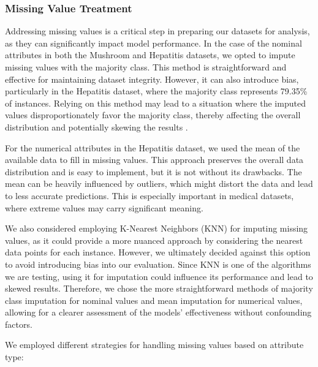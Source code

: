 \subsubsection{Missing Value Treatment}
Addressing missing values is a critical step in preparing our datasets for analysis, as they can significantly impact model performance.
In the case of the nominal attributes in both the Mushroom and Hepatitis datasets, we opted to impute missing values with the majority class.
This method is straightforward and effective for maintaining dataset integrity.
However, it can also introduce bias, particularly in the Hepatitis dataset, where the majority class represents 79.35\% of instances.
Relying on this method may lead to a situation where the imputed values disproportionately favor the majority class, thereby affecting the overall distribution
and potentially skewing the results \cite{data_cleaning}.

For the numerical attributes in the Hepatitis dataset, we used the mean of the available data to fill in missing values.
This approach preserves the overall data distribution and is easy to implement, but it is not without its drawbacks.
The mean can be heavily influenced by outliers, which might distort the data and lead to less accurate predictions.
This is especially important in medical datasets, where extreme values may carry significant meaning.

We also considered employing K-Nearest Neighbors (KNN) for imputing missing values, as it could provide a more nuanced approach by considering the nearest data points for each instance.
However, we ultimately decided against this option to avoid introducing bias into our evaluation.
Since KNN is one of the algorithms we are testing, using it for imputation could influence its performance and lead to skewed results.
Therefore, we chose the more straightforward methods of majority class imputation for nominal values and mean imputation for numerical values, allowing for a clearer assessment of the models’ effectiveness without confounding factors.

We employed different strategies for handling missing values based on attribute type:

